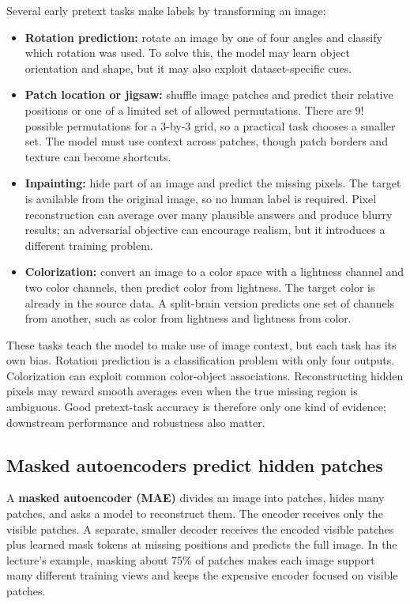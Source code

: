 Several early pretext tasks make labels by transforming an image:

\begin{itemize}
\tightlist
\item
  \textbf{Rotation prediction:} rotate an image by one of four angles and classify which rotation was used. To solve this, the model may learn object orientation and shape, but it may also exploit dataset-specific cues.
\item
  \textbf{Patch location or jigsaw:} shuffle image patches and predict their relative positions or one of a limited set of allowed permutations. There are \(9!\) possible permutations for a 3-by-3 grid, so a practical task chooses a smaller set. The model must use context across patches, though patch borders and texture can become shortcuts.
\item
  \textbf{Inpainting:} hide part of an image and predict the missing pixels. The target is available from the original image, so no human label is required. Pixel reconstruction can average over many plausible answers and produce blurry results; an adversarial objective can encourage realism, but it introduces a different training problem.
\item
  \textbf{Colorization:} convert an image to a color space with a lightness channel and two color channels, then predict color from lightness. The target color is already in the source data. A split-brain version predicts one set of channels from another, such as color from lightness and lightness from color.
\end{itemize}

These tasks teach the model to make use of image context, but each task has its own bias. Rotation prediction is a classification problem with only four outputs. Colorization can exploit common color-object associations. Reconstructing hidden pixels may reward smooth averages even when the true missing region is ambiguous. Good pretext-task accuracy is therefore only one kind of evidence; downstream performance and robustness also matter.

\subsection{Masked autoencoders predict hidden patches}\label{04-visual-computing-ii-ch031-masked-autoencoders-predict-hidden-patches}

A \textbf{masked autoencoder (MAE)} divides an image into patches, hides many patches, and asks a model to reconstruct them. The encoder receives only the visible patches. A separate, smaller decoder receives the encoded visible patches plus learned mask tokens at missing positions and predicts the full image. In the lecture's example, masking about 75\% of patches makes each image support many different training views and keeps the expensive encoder focused on visible patches.


